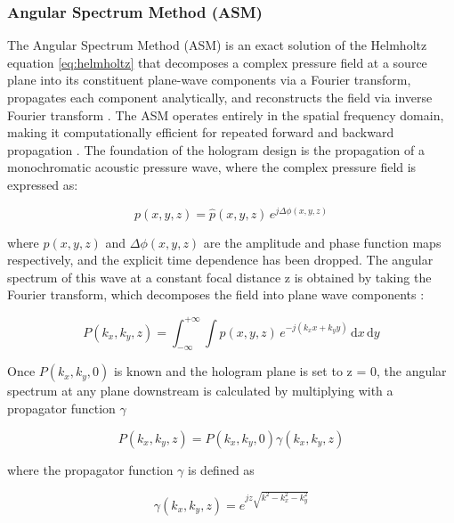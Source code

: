 \documentclass[11pt,a4paper]{article}
\begin{document}
\subsubsection{Angular Spectrum Method (ASM)}
\label{subsubsec:ASM}

The Angular Spectrum Method (ASM) is an exact solution of the Helmholtz equation \ref{eq:helmholtz} that decomposes a complex pressure field at a source plane into its constituent plane-wave components via a Fourier transform, propagates each component analytically, and reconstructs the field via inverse Fourier transform \cite{konijnenberg2021optics}. The ASM operates entirely in the spatial frequency domain, making it computationally efficient for repeated forward and backward propagation \cite{melde2016holograms}. The foundation of the hologram design is the propagation of a monochromatic acoustic pressure wave, where the complex pressure field is expressed as:

\begin{equation}
    p(x, y, z) = \hat{p}(x, y, z) \, e^{j\Delta\phi(x,y,z)}
\end{equation}

\noindent where $\hat{p}(x,y,z)$ and $\Delta\phi(x,y,z)$ are the amplitude and phase function maps respectively, and the explicit time dependence has been dropped. The angular spectrum of this wave at a constant focal distance z is obtained by taking the Fourier transform, which decomposes the field into plane wave components \cite{konijnenberg2021optics}:

\begin{equation}
    P(k_x, k_y, z) = \int_{-\infty}^{+\infty} \int p(x, y, z) \, e^{-j(k_x x + k_y y)} \, \mathrm{d}x \, \mathrm{d}y
\end{equation}

\noindent Once $P(k_x, k_y, 0)$ is known and the hologram plane is set to z = 0, the angular spectrum at any plane downstream is calculated by multiplying with a propagator function $\gamma$ \cite{melde2016holograms}

\begin{equation}
   P(k_x, k_y, z) = P(k_x, k_y, 0) \gamma(k_x, k_y, z)
\label{eq:forward}
\end{equation}

\noindent where the propagator function $\gamma$ is defined as  

\begin{equation}
    \gamma(k_x, k_y, z) = e^{jz\sqrt{k^2 - k_x^2 - k_y^2}}
\end{equation}
\end{document}

